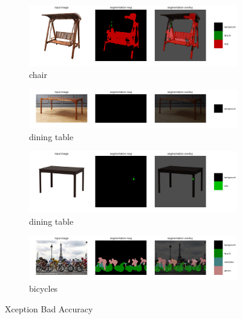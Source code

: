 \documentclass{article}
\begin{document}
\begin{figure}[h!]
\begin{subfigure}[b]{1.0\textwidth}
\includegraphics[width=\linewidth]{chair2_xception.png}
\caption{chair}
\end{subfigure}
\begin{subfigure}[b]{1.0\textwidth}
\includegraphics[width=\linewidth]{dining_table1_xception.png}
\caption{dining table}
\end{subfigure}
\begin{subfigure}[b]{1.0\textwidth}
\includegraphics[width=\linewidth]{dining_table3_xception.png}
\caption{dining table}
\end{subfigure}
\begin{subfigure}[b]{1.0\textwidth}
\includegraphics[width=\linewidth]{bicycle1_xception.png}
\caption{bicycles}
\end{subfigure}
\caption{Xception Bad Accuracy}
\end{figure}
\end{document}
